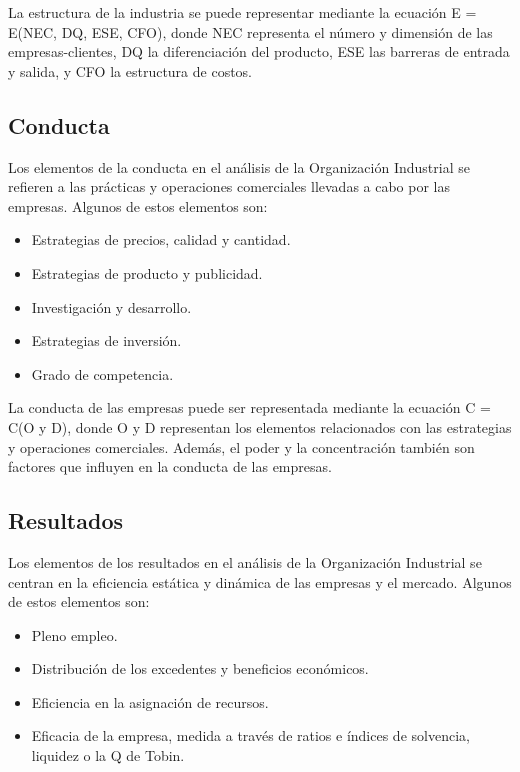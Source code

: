 \documentclass[
  doc,
  floatsintext,
  longtable,
  a4paper,
  nolmodern,
  notxfonts,
  notimes,
  12pt,
  colorlinks=true,linkcolor=blue,citecolor=blue,urlcolor=blue]{apa7}
\providecommand{\tightlist}{%
  \setlength{\itemsep}{0pt}\setlength{\parskip}{0pt}}
\begin{document}
La estructura de la industria se puede representar mediante la ecuación
E = E(NEC, DQ, ESE, CFO), donde NEC representa el número y dimensión de
las empresas-clientes, DQ la diferenciación del producto, ESE las
barreras de entrada y salida, y CFO la estructura de costos.

\subsection{Conducta}\label{conducta}

Los elementos de la conducta en el análisis de la Organización
Industrial se refieren a las prácticas y operaciones comerciales
llevadas a cabo por las empresas. Algunos de estos elementos son:

\begin{itemize}
\tightlist
\item
  Estrategias de precios, calidad y cantidad.
\item
  Estrategias de producto y publicidad.
\item
  Investigación y desarrollo.
\item
  Estrategias de inversión.
\item
  Grado de competencia.
\end{itemize}

La conducta de las empresas puede ser representada mediante la ecuación
C = C(O y D), donde O y D representan los elementos relacionados con las
estrategias y operaciones comerciales. Además, el poder y la
concentración también son factores que influyen en la conducta de las
empresas.

\subsection{Resultados}\label{resultados}

Los elementos de los resultados en el análisis de la Organización
Industrial se centran en la eficiencia estática y dinámica de las
empresas y el mercado. Algunos de estos elementos son:

\begin{itemize}
\tightlist
\item
  Pleno empleo.
\item
  Distribución de los excedentes y beneficios económicos.
\item
  Eficiencia en la asignación de recursos.
\item
  Eficacia de la empresa, medida a través de ratios e índices de
  solvencia, liquidez o la Q de Tobin.
\end{itemize}
\end{document}
